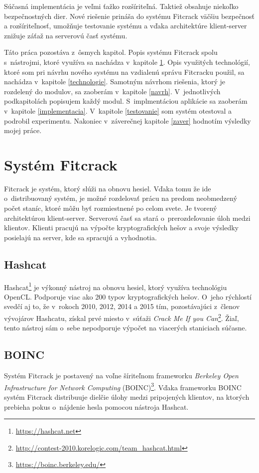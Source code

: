 \documentclass[slovak]{fitthesis}
\begin{document}
Súčasná implementácia je veľmi ťažko rozšíriteľná. Taktiež obsahuje niekoľko bezpečnostných dier. Nové riešenie prináša do systému Fitcrack väčšiu bezpečnosť a rozšíriteľnosť, umožňuje testovanie systému a vďaka architektúre klient-server znižuje záťaž na serverovú časť systému.

Táto práca pozostáva z~ôsmych kapitol. Popis systému Fitcrack spolu s~nástrojmi, ktoré využíva sa nachádza v~kapitole \ref{Fitcrack}. Opis využitých technológií, ktoré som pri návrhu nového systému na vzdialenú správu Fitcracku použil, sa nachádza v~kapitole \ref{technologie}. Samotným návrhom riešenia, ktorý je rozdelený do modulov, sa zaoberám v~kapitole \ref{navrh}. V~jednotlivých podkapitolách popisujem každý modul. S~implmentáciou aplikácie sa zaoberám v~kapitole \ref{implementacia}. V~kapitole \ref{testovanie} som systém otestoval a podrobil experimentu. Nakoniec v~záverečnej kapitole \ref{zaver} hodnotím výsledky mojej práce. 



\chapter{Systém Fitcrack}\label{Fitcrack}
Fitcrack je systém, ktorý slúži na obnovu hesiel. Vďaka tomu že ide o~distribuovaný systém, je možné rozdelovať prácu na predom neobmedzený počet staníc, ktoré môžu byť rozmiestnené po celom svete. Je tvorený  architektúrou klient-server. Serverová časť sa stará o~prerozdeľovanie úloh medzi klientov. Klienti pracujú na výpočte kryptografických hešov a svoje výsledky posielajú na server, kde sa spracujú a vyhodnotia.
\cite{fitcrackSprava}


\section{Hashcat}\label{hashcat}
Hashcat\footnote{\url{https://hashcat.net}} je výkonný nástroj na obnovu hesiel, ktorý využíva technológiu OpenCL. Podporuje viac ako 200 typov kryptografických hešov. O~jeho rýchlostí svedčí aj to, že v~rokoch 2010, 2012, 2014 a 2015 tím, pozostávajúci z~členov vývojárov Hashcatu, získal prvé miesto v~súťaži \textit{Crack Me If you Can}\footnote{\url{http://contest-2010.korelogic.com/team_hashcat.html}}. Žiaľ, tento nástroj sám o~sebe nepodporuje výpočet na viacerých staniciach súčasne.


\section{BOINC} \label{BOINC}
Systém Fitcrack je postavený na voľne šíriteľnom frameworku \textit{Berkeley Open Infrastructure for Network Computing} (BOINC)\footnote{\url{https://boinc.berkeley.edu/}}. Vďaka frameworku BOINC systém Fitcrack distribuuje dielčie úlohy medzi pripojených klientov, na ktorých prebieha pokus o~nájdenie hesla pomocou nástroja Hashcat.
\end{document}
